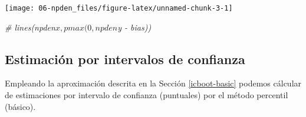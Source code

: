 \documentclass[]{book}
\newenvironment{Shaded}{\begin{snugshade}}{\end{snugshade}}
\newcommand{\KeywordTok}[1]{\textcolor[rgb]{0.13,0.29,0.53}{\textbf{#1}}}
\newcommand{\DataTypeTok}[1]{\textcolor[rgb]{0.13,0.29,0.53}{#1}}
\newcommand{\DecValTok}[1]{\textcolor[rgb]{0.00,0.00,0.81}{#1}}
\newcommand{\FloatTok}[1]{\textcolor[rgb]{0.00,0.00,0.81}{#1}}
\newcommand{\StringTok}[1]{\textcolor[rgb]{0.31,0.60,0.02}{#1}}
\newcommand{\CommentTok}[1]{\textcolor[rgb]{0.56,0.35,0.01}{\textit{#1}}}
\newcommand{\OperatorTok}[1]{\textcolor[rgb]{0.81,0.36,0.00}{\textbf{#1}}}
\newcommand{\NormalTok}[1]{#1}
\theoremstyle{break}
\theoremstyle{definition}
\theoremstyle{definition}
\theoremstyle{definition}
\theoremstyle{remark}
\begin{document}
\begin{Shaded}
\end{Shaded}

\begin{center}\texttt{[image: 06-npden\_files/figure-latex/unnamed-chunk-3-1]} \end{center}

\begin{Shaded}
\begin{Highlighting}[]
\CommentTok{# lines(npden$x, pmax(0, npden$y - bias))}
\end{Highlighting}
\end{Shaded}

\subsection{Estimación por intervalos de confianza}\label{npden-r-ic}

Empleando la aproximación descrita en la Sección \ref{icboot-basic}
podemos cálcular de estimaciones por intervalo de confianza (puntuales)
por el método percentil (básico).
\end{document}
